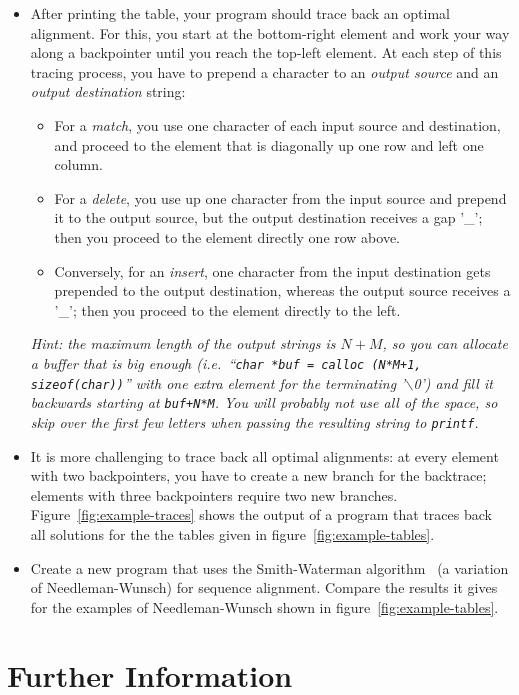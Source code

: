 \documentclass[a4paper,10pt]{article}
\begin{document}
\begin{itemize}
\item
  After printing the table, your program should trace back an optimal alignment.
  For this, you start at the bottom-right element and work your way along a backpointer until you reach the top-left element.
  At each step of this tracing process, you have to prepend a character to an \emph{output source} and an \emph{output destination} string:
  \begin{itemize}
  \item
    For a \emph{match}, you use one character of each input source and destination, and proceed to the element that is diagonally up one row and left one column.
  \item
    For a \emph{delete}, you use up one character from the input source and prepend it to the output source, but the output destination receives a gap '\_';
    then you proceed to the element directly one row above.
  \item
    Conversely, for an \emph{insert}, one character from the input destination gets prepended to the output destination, whereas the output source receives a '\_';
    then you proceed to the element directly to the left.
  \end{itemize}
  \emph{Hint: the maximum length of the output strings is $N+M$, so you can allocate a buffer that is big enough (i.e.\ ``\texttt{char *buf = calloc (N*M+1, sizeof(char))}'' with one extra element for the terminating '$\backslash$0') and fill it backwards starting at \texttt{buf+N*M}.
    You will probably not use all of the space, so skip over the first few letters when passing the resulting string to \texttt{printf}.}
\item
  It is more challenging to trace back all optimal alignments:
  at every element with two backpointers, you have to create a new branch for the backtrace; elements with three backpointers require two new branches.
  Figure~\ref{fig:example-traces} shows the output of a program that traces back all solutions for the the tables given in figure~\ref{fig:example-tables}.
\item
  Create a new program that uses the Smith-Waterman algorithm~\cite{wikipedia:smith-waterman} (a variation of Needleman-Wunsch) for sequence alignment.
  Compare the results it gives for the examples of Needleman-Wunsch shown in figure~\ref{fig:example-tables}.
\end{itemize}



\section{Further Information}
\end{document}
